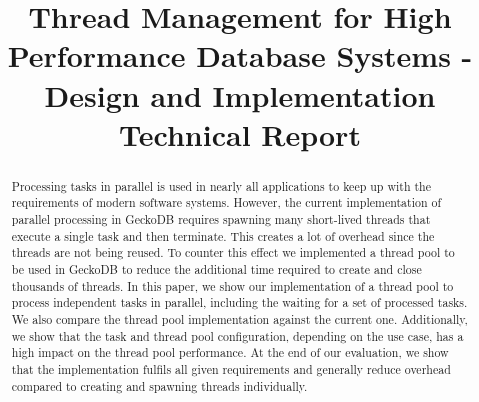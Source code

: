 \documentclass[conference]{IEEEtran}
\begin{document}


\title{Thread Management for High Performance Database Systems - Design and Implementation \\{\large Technical Report}\\}

\author{
	 \and
}

\maketitle

\begin{abstract}
        Processing tasks in parallel is used in nearly all applications to keep
        up with the requirements of modern software systems. However, the
        current implementation of parallel processing in GeckoDB requires
        spawning many short-lived threads that execute a single task and then
        terminate. This creates a lot of overhead since the threads are not
        being reused. To counter this effect we implemented a thread pool to be
        used in GeckoDB to reduce the additional time required
        to create and close thousands of threads. In this paper, we show our
        implementation of a thread pool to process independent tasks in parallel,
        including the waiting for a set of processed tasks. We also compare the
        thread pool implementation against the current one. Additionally, we show that the task and thread pool configuration,
        depending on the use case, has a high impact on the thread
        pool performance. At the end of our evaluation, we show that the implementation 
        fulfils all given requirements and generally reduce
        overhead compared to creating and spawning threads individually.
\end{abstract}
\end{document}
